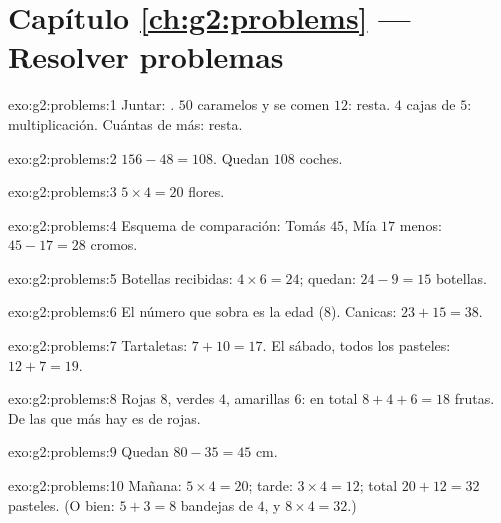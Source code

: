 \section*{Capítulo \ref{ch:g2:problems} --- Resolver problemas}

\begin{solution}{exo:g2:problems:1}
Juntar: . $50$ caramelos y se comen $12$: resta. $4$
cajas de $5$: multiplicación. Cuántas de más: resta.
\end{solution}

\begin{solution}{exo:g2:problems:2}
$156 - 48 = 108$. Quedan $108$ coches.
\end{solution}

\begin{solution}{exo:g2:problems:3}
$5 \times 4 = 20$ flores.
\end{solution}

\begin{solution}{exo:g2:problems:4}
Esquema de comparación: Tomás $45$, Mía $17$ menos:
$45 - 17 = 28$ cromos.
\end{solution}

\begin{solution}{exo:g2:problems:5}
Botellas recibidas: $4 \times 6 = 24$; quedan:
$24 - 9 = 15$ botellas.
\end{solution}

\begin{solution}{exo:g2:problems:6}
El número que sobra es la edad ($8$). Canicas:
$23 + 15 = 38$.
\end{solution}

\begin{solution}{exo:g2:problems:7}
Tartaletas: $7 + 10 = 17$. El sábado, todos los pasteles:
$12 + 7 = 19$.
\end{solution}

\begin{solution}{exo:g2:problems:8}
Rojas $8$, verdes $4$, amarillas $6$: en total $8 + 4 + 6 = 18$ frutas.
De las que más hay es de rojas.
\end{solution}

\begin{solution}{exo:g2:problems:9}
Quedan $80 - 35 = 45$ cm.
\end{solution}

\begin{solution}{exo:g2:problems:10}
Mañana: $5 \times 4 = 20$; tarde: $3 \times 4 = 12$; total
$20 + 12 = 32$ pasteles. (O bien: $5 + 3 = 8$ bandejas de $4$, y
$8 \times 4 = 32$.)
\end{solution}
